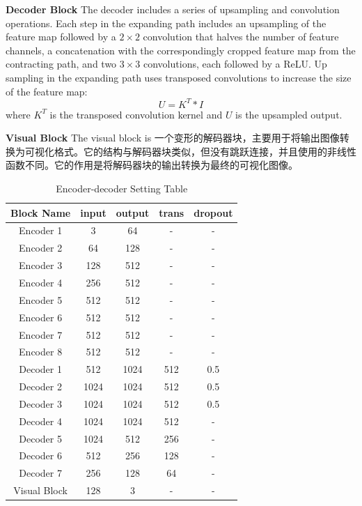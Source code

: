 \documentclass[twocolumn]{article}
\begin{document}
\textbf{Decoder Block} The decoder includes a series of upsampling and convolution operations. Each step in the expanding path includes an upsampling of the feature map followed by a $2\times2$ convolution that halves the number of feature channels, a concatenation with the correspondingly cropped feature map from the contracting path, and two $3\times3$ convolutions, each followed by a ReLU. Up sampling in the expanding path uses transposed convolutions to increase the size of the feature map:
\[
	U = K^T * I
\]
where \(K^T\) is the transposed convolution kernel and \(U\) is the upsampled output.

\textbf{Visual Block} The visual block is 一个变形的解码器块，主要用于将输出图像转换为可视化格式。它的结构与解码器块类似，但没有跳跃连接，并且使用的非线性函数不同。它的作用是将解码器块的输出转换为最终的可视化图像。

\begin{table}[h]
	\caption{Encoder-decoder Setting Table}
	\label{tab:encoder_setting}
	\begin{tabular}{ccccc}
		\hline
		Block Name   & input & output & trans & dropout \\
		\hline
		Encoder 1    & 3     & 64     & -     & -       \\
		Encoder 2    & 64    & 128    & -     & -       \\
		Encoder 3    & 128   & 512    & -     & -       \\
		Encoder 4    & 256   & 512    & -     & -       \\
		Encoder 5    & 512   & 512    & -     & -       \\
		Encoder 6    & 512   & 512    & -     & -       \\
		Encoder 7    & 512   & 512    & -     & -       \\
		Encoder 8    & 512   & 512    & -     & -       \\
		Decoder 1    & 512   & 1024   & 512   & 0.5     \\
		Decoder 2    & 1024  & 1024   & 512   & 0.5     \\
		Decoder 3    & 1024  & 1024   & 512   & 0.5     \\
		Decoder 4    & 1024  & 1024   & 512   & -       \\
		Decoder 5    & 1024  & 512    & 256   & -       \\
		Decoder 6    & 512   & 256    & 128   & -       \\
		Decoder 7    & 256   & 128    & 64    & -       \\
		Visual Block & 128   & 3      & -     & -       \\
		\hline
	\end{tabular}
\end{table}
\end{document}
